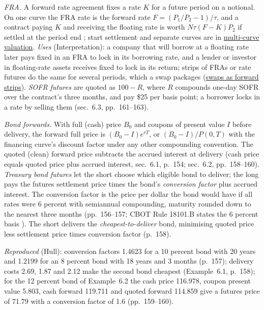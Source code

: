 \begin{qfmethod}\label{meth:rate-bond-forward-valuation}
 \emph{FRA.} A forward rate agreement fixes a rate $K$ for a future period on a notional. On one curve the FRA rate is the forward rate $F=(P_1/P_2-1)/\tau$, and a contract paying $K$ and receiving the floating rate is worth $N\tau(F-K)P_2$ if settled at the period end \citep[chap.~4, sec.~4.9, pp.~110--112]{s7-hulloptions}; start settlement and separate curves are in \hyperref[mod:multi-curve-fra-swap-valuation]{multi-curve valuation}. \emph{Uses} (Interpretation): a company that will borrow at a floating rate later pays fixed in an FRA to lock in its borrowing rate, and a lender or investor in floating-rate assets receives fixed to lock in its return; strips of FRAs or rate futures do the same for several periods, which a swap packages (\hyperref[def:swaps-as-forward-strips]{swaps as forward strips}). \emph{SOFR futures} are quoted as $100-R$, where $R$ compounds one-day SOFR over the contract's three months, and pay \$25 per basis point; a borrower locks in a rate by selling them (sec.~6.3, pp.~161--163).

\emph{Bond forwards.} With full (cash) price $B_0$ and coupons of present value $I$ before delivery, the forward full price is $(B_0-I)e^{rT}$, or $(B_0-I)/P(0,T)$ with the financing curve's discount factor under any other compounding convention. The quoted (clean) forward price subtracts the accrued interest at delivery (cash price equals quoted price plus accrued interest, sec.~6.1, p.~154; sec.~6.2, pp.~158--160). \emph{Treasury bond futures} let the short choose which eligible bond to deliver; the long pays the futures settlement price times the bond's \emph{conversion factor} plus accrued interest. The conversion factor is the price per dollar the bond would have if all rates were 6 percent with semiannual compounding, maturity rounded down to the nearest three months (pp.~156--157; CBOT Rule 18101.B states the 6 percent basis \citep[Rule 18101.B]{cbot-treasury-chapters-2026}). The short delivers the \emph{cheapest-to-deliver} bond, minimising quoted price less settlement price times conversion factor (p.~158).

 \emph{Reproduced} (Hull): conversion factors 1.4623 for a 10 percent bond with 20 years and 1.2199 for an 8 percent bond with 18 years and 3 months (p.~157); delivery costs 2.69, 1.87 and 2.12 make the second bond cheapest (Example~6.1, p.~158); for the 12 percent bond of Example~6.2 the cash price 116.978, coupon present value 5.803, cash forward 119.711 and quoted forward 114.859 give a futures price of 71.79 with a conversion factor of 1.6 (pp.~159--160).


\end{qfmethod}
